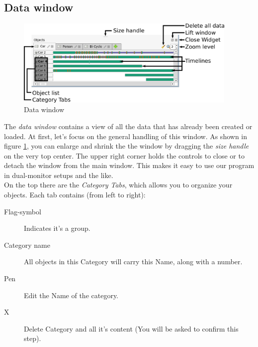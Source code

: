 \subsection{Data window}
\begin{figure}[t]
\centering
\includegraphics[angle=0,width=0.95\textwidth]{images/datawindow_final}
\caption{Data window}
\label{fig:datawindow}
\end{figure}

The \emph{data window} contains a view of all the data that has already been created or loaded.
At first, let's focus on the general handling of this window. As shown in figure \ref{fig:datawindow}, you can enlarge and shrink the the window by dragging the \emph{size handle} on the very top center. The upper right corner holds the controls to close or to detach the window from the main window. This makes it easy to use our program in dual-monitor setups and the like.\\

On the top there are the \emph{Category Tabs}, which allows you to organize your objects. Each tab contains (from left to right):
\begin{description}
   \item[Flag-symbol] Indicates it's a group.
   \item[Category name] All objects in this Category will carry this Name, along with a number.
   \item[Pen] Edit the Name of the category.
   \item[X] Delete Category and all it's content (You will be asked to confirm this step).
\end{description}

